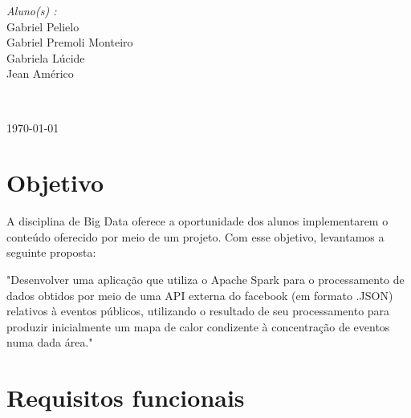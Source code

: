 \documentclass[numbers,a4paper,12pt]{article}
\begin{document}
\begin{titlepage}
\begin{minipage}{0.4\textwidth}
			\begin{flushright} \large
			\emph{Aluno(s) :} \\
			Gabriel Pelielo\\
            Gabriel Premoli Monteiro\\
            Gabriela Lúcide\\
            Jean Américo\\
		\end{flushright}
       	

   
	\end{minipage}\\[2 cm]
	
\begin{center}
	\small \today
\end{center}
    
    
    
    
	
\end{titlepage}


\tableofcontents
\pagebreak


\section{Objetivo}


A disciplina de Big Data oferece a oportunidade dos alunos implementarem o conteúdo oferecido por meio de um projeto. Com esse objetivo, levantamos a seguinte proposta: 

"Desenvolver uma aplicação que utiliza o Apache Spark para o processamento de dados obtidos por meio de uma API externa do facebook (em formato .JSON) relativos à eventos públicos, utilizando o resultado de seu processamento para produzir inicialmente um mapa de calor condizente à concentração de eventos numa dada área."

\section{Requisitos funcionais}
\end{document}
